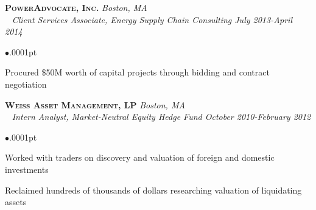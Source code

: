 \documentclass[11pt]{article}
\newcommand{\employer}[4]{
	{\hspace*{-20pt} {\small{\textbf{\textsc{ #1}}}}
  \hfill \small{\emph{#2}}\\ ~\hspace*{-20pt} \small \emph{ #3 \hfill #4}}\\ }
\newenvironment{achievements}{\begin{list}{$\bullet$}{\topsep .0001pt \itemsep -2pt}}{\vspace*{5pt}\end{list} }
\begin{document}
\employer{PowerAdvocate, Inc.} {Boston, MA} {Client Services Associate, Energy Supply Chain Consulting} {July 2013-April 2014}
	\begin{achievements}
		\item Procured \$50M worth of capital projects through bidding and contract negotiation
	\end{achievements} 


\employer{Weiss Asset Management, LP} {Boston, MA} {Intern Analyst, Market-Neutral Equity Hedge Fund} {October 2010-February 2012}
	\begin{achievements}
		\item Worked with traders on discovery and valuation of foreign and domestic investments %
		\item Reclaimed hundreds of thousands of dollars researching valuation of liquidating assets
	\end{achievements}
	
\end{document}

